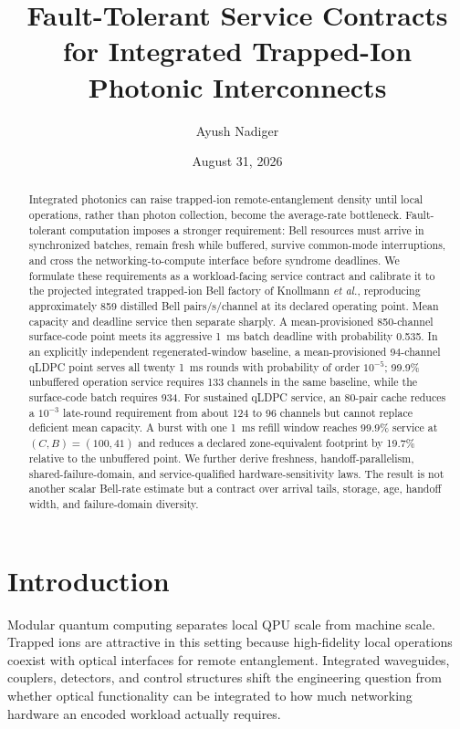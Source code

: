 \documentclass[aps,prx,reprint,superscriptaddress,nofootinbib,longbibliography,floatfix]{revtex4-2}
\begin{document}
\title{Fault-Tolerant Service Contracts for Integrated Trapped-Ion Photonic Interconnects}
\author{Ayush Nadiger}
\date{August 31, 2026}

\begin{abstract}
Integrated photonics can raise trapped-ion remote-entanglement density until local operations, rather than photon collection, become the average-rate bottleneck. Fault-tolerant computation imposes a stronger requirement: Bell resources must arrive in synchronized batches, remain fresh while buffered, survive common-mode interruptions, and cross the networking-to-compute interface before syndrome deadlines. We formulate these requirements as a workload-facing service contract and calibrate it to the projected integrated trapped-ion Bell factory of Knollmann \emph{et al.}, reproducing approximately 859 distilled Bell pairs/s/channel at its declared operating point. Mean capacity and deadline service then separate sharply. A mean-provisioned 850-channel surface-code point meets its aggressive \SI{1}{ms} batch deadline with probability 0.535. In an explicitly independent regenerated-window baseline, a mean-provisioned 94-channel qLDPC point serves all twenty \SI{1}{ms} rounds with probability of order $10^{-5}$; 99.9\% unbuffered operation service requires 133 channels in the same baseline, while the surface-code batch requires 934. For sustained qLDPC service, an 80-pair cache reduces a $10^{-3}$ late-round requirement from about 124 to 96 channels but cannot replace deficient mean capacity. A burst with one \SI{1}{ms} refill window reaches 99.9\% service at $(C,B)=(100,41)$ and reduces a declared zone-equivalent footprint by 19.7\% relative to the unbuffered point. We further derive freshness, handoff-parallelism, shared-failure-domain, and service-qualified hardware-sensitivity laws. The result is not another scalar Bell-rate estimate but a contract over arrival tails, storage, age, handoff width, and failure-domain diversity.
\end{abstract}
\maketitle

\section{Introduction}
Modular quantum computing separates local QPU scale from machine scale. Trapped ions are attractive in this setting because high-fidelity local operations coexist with optical interfaces for remote entanglement. Integrated waveguides, couplers, detectors, and control structures shift the engineering question from whether optical functionality can be integrated to how much networking hardware an encoded workload actually requires.
\end{document}
